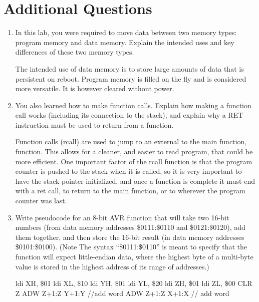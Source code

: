 \documentclass[12pt,letterpaper]{article}
\begin{document}
\section{Additional Questions}
\begin{enumerate}
    \item
    In this lab, you were required to move data between two memory types: program memory and data memory. Explain the intended uses and key differences of these two memory types.

    The intended use of data memory is to store large amounts of data that is persistent on reboot. Program memory is filled on the fly and is considered more versatile. It is however cleared without power. 

	\item 
	You also learned how to make function calls. Explain how making a function call works (including its connection to the stack), and explain why a RET instruction must be used to return from a function. 
	
	Function calls (rcall) are used to jump to an external to the main function, function. This allows for a cleaner, and easier to read program, that could be more efficient. One important factor of the rcall function is that the program counter is pushed to the stack when it is called, so it is very important to have the stack pointer initialized, and once a function is complete it must end with a ret call, to return to the main function, or to wherever the program counter was last.
	
	
	\item 
	Write pseudocode for an 8-bit AVR function that will take two 16-bit numbers (from data memory addresses \$0111:\$0110 and \$0121:\$0120), add them together, and then store the 16-bit result (in data memory addresses \$0101:\$0100). (Note The syntax “\$0111:\$0110” is meant to specify that the function will expect little-endian data, where the highest byte of a multi-byte value is stored in the highest address of its range of addresses.)
	
	ldi XH, \$01 \newline
	ldi XL, \$10 \newline
	ldi YH, \$01 \newline
	ldi YL, \$20 \newline
	ldi ZH, \$01 \newline
	ldi ZL, \$00 \newline
	CLR Z
	ADW Z+1:Z Y+1:Y //add word
	ADW Z+1:Z X+1:X // add word
	

\end{enumerate}
\end{document}
